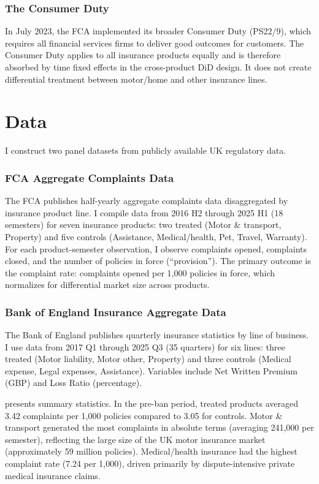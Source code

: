 \documentclass[12pt]{article}
\begin{document}
\subsubsection*{The Consumer Duty} In July 2023, the FCA implemented its broader Consumer Duty (PS22/9), which requires all financial services firms to deliver good outcomes for customers. The Consumer Duty applies to all insurance products equally and is therefore absorbed by time fixed effects in the cross-product DiD design. It does not create differential treatment between motor/home and other insurance lines.


\section{Data}

I construct two panel datasets from publicly available UK regulatory data.

\subsubsection*{FCA Aggregate Complaints Data} The FCA publishes half-yearly aggregate complaints data disaggregated by insurance product line. I compile data from 2016 H2 through 2025 H1 (18 semesters) for seven insurance products: two treated (Motor \& transport, Property) and five controls (Assistance, Medical/health, Pet, Travel, Warranty). For each product-semester observation, I observe complaints opened, complaints closed, and the number of policies in force (``provision''). The primary outcome is the complaint rate: complaints opened per 1,000 policies in force, which normalizes for differential market size across products.

\subsubsection*{Bank of England Insurance Aggregate Data} The Bank of England publishes quarterly insurance statistics by line of business. I use data from 2017 Q1 through 2025 Q3 (35 quarters) for six lines: three treated (Motor liability, Motor other, Property) and three controls (Medical expense, Legal expenses, Assistance). Variables include Net Written Premium (GBP) and Loss Ratio (percentage).

 presents summary statistics. In the pre-ban period, treated products averaged 3.42 complaints per 1,000 policies compared to 3.05 for controls. Motor \& transport generated the most complaints in absolute terms (averaging 241,000 per semester), reflecting the large size of the UK motor insurance market (approximately 59 million policies). Medical/health insurance had the highest complaint rate (7.24 per 1,000), driven primarily by dispute-intensive private medical insurance claims.
\end{document}
